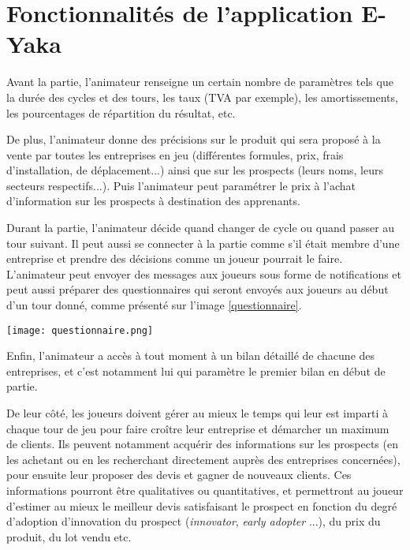     \section{Fonctionnalités de l'application E-Yaka}
    
Avant la partie, l'animateur renseigne un certain nombre de paramètres tels que la durée des cycles et des tours, les taux (TVA par exemple), les amortissements, les pourcentages de répartition du résultat, etc.

De plus, l'animateur donne des précisions sur le produit qui sera proposé à la vente par toutes les entreprises en jeu (différentes formules, prix, frais d'installation, de déplacement...) ainsi que sur les prospects (leurs noms, leurs secteurs respectifs...). Puis l'animateur peut paramétrer le prix à l'achat d'information sur les prospects à destination des apprenants.

Durant la partie, l'animateur décide quand changer de cycle ou quand passer au tour suivant. Il peut aussi se connecter à la partie comme s'il était membre d'une entreprise et prendre des décisions comme un joueur pourrait le faire.
L'animateur peut envoyer des messages aux joueurs sous forme de notifications et peut aussi préparer des questionnaires qui seront envoyés aux joueurs au début d'un tour donné, comme présenté sur l'image \ref{questionnaire}.

\begin{center}
\texttt{[image: questionnaire.png]}
\label{questionnaire}
\end{center}


Enfin, l'animateur a accès à tout moment à un bilan détaillé de chacune des entreprises, et c'est notamment lui qui paramètre le premier bilan en début de partie.

De leur côté, les joueurs doivent gérer au mieux le temps qui leur est imparti à chaque tour de jeu pour faire croître leur entreprise et démarcher un maximum de clients. Ils peuvent notamment acquérir des informations sur les prospects (en les achetant ou en les recherchant directement auprès des entreprises concernées), pour ensuite leur proposer des devis et gagner de nouveaux clients. Ces informations pourront être qualitatives ou quantitatives, et permettront au joueur d'estimer au mieux le meilleur devis satisfaisant le prospect en fonction du degré d'adoption d'innovation du prospect (\emph{innovator}, \emph{early adopter} ...), du prix du produit, du lot vendu etc.

